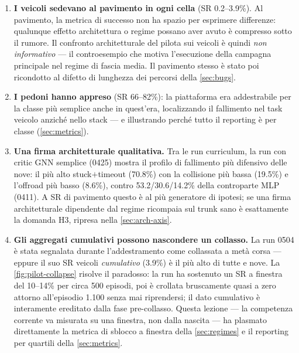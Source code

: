 \begin{enumerate}
  \item \textbf{I veicoli sedevano al pavimento in ogni cella} (SR
        0.2--3.9\%). Al pavimento, la metrica di successo non ha spazio
        per esprimere differenze: qualunque effetto architettura o
        regime possano aver avuto è compresso sotto il rumore. Il
        confronto architetturale del pilota sui veicoli è quindi
        \emph{non informativo} --- il controesempio che motiva
        l'esecuzione della campagna principale nel regime di fascia
        media. Il pavimento stesso è stato poi ricondotto al difetto di
        lunghezza dei percorsi della \cref{sec:bugs}.
  \item \textbf{I pedoni hanno appreso} (SR 66--82\%): la piattaforma
        era addestrabile per la classe più semplice anche in
        quest'era, localizzando il fallimento nel task veicolo anziché
        nello stack --- e illustrando perché tutto il reporting è per
        classe (\cref{sec:metrics}).
  \item \textbf{Una firma architetturale qualitativa.} Tra le run
        curriculum, la run con critic GNN semplice (0425) mostra il
        profilo di fallimento più difensivo delle nove: il più alto
        stuck$+$timeout (70.8\%) con la collisione più bassa (19.5\%) e
        l'offroad più basso (8.6\%), contro 53.2/30.6/14.2\% della
        controparte MLP (0411). A SR di pavimento questo è al più
        generatore di ipotesi; se una firma architetturale dipendente
        dal regime ricompaia sul trunk sano è esattamente la domanda
        H3, ripresa nella \cref{sec:arch-axis}.
  \item \textbf{Gli aggregati cumulativi possono nascondere un
        collasso.} La run 0504 è stata segnalata durante
        l'addestramento come collassata a metà corsa --- eppure il suo
        SR veicoli \emph{cumulativo} (3.9\%) è il più alto di tutte e
        nove. La \cref{fig:pilot-collapse} risolve il paradosso: la run
        ha sostenuto un SR a finestra del 10--14\% per circa 500
        episodi, poi è crollata bruscamente quasi a zero attorno
        all'episodio 1{.}100 senza mai riprendersi; il dato cumulativo è
        interamente ereditato dalla fase pre-collasso. Questa lezione
        --- la competenza corrente va misurata su una finestra, non
        dalla nascita --- ha plasmato direttamente la metrica di sblocco
        a finestra della \cref{sec:regimes} e il reporting per quartili
        della \cref{sec:metrics}.
\end{enumerate}

